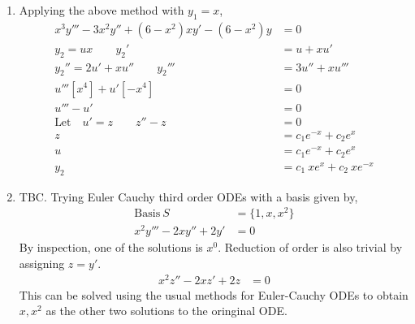 \begin{enumerate}
\begin{enumerate}
              \item Applying the above method with $ y_{1} = x $,
                    \begin{align}
                        x^{3}y''' - 3x^{2}y'' + (6 - x^{2})xy' - (6 - x^{2})y
                                                               & = 0             \\
                        y_{2} = ux \qquad y_{2}'               & = u + xu'       \\
                        y_{2}'' =2u' + xu'' \qquad y_{2}'''    & = 3u'' + xu'''  \\
                        u'''[x^{4}] + u'[-x^{4}]               & = 0             \\
                        u''' - u'                              & = 0             \\
                        \text{Let} \quad u' = z \qquad z'' - z & = 0             \\
                        z                                      & = c_{1}e^{-x}
                        + c_{2}e^{x}                                             \\
                        u                                      & = c_{1}e^{-x}
                        + c_{2}e^{x}                                             \\
                        y_{2}                                  & = c_{1}\ xe^{x}
                        + c_{2}\ xe^{-x}
                    \end{align}

              \item TBC. Trying Euler Cauchy third order ODEs with a basis given by,
                    \begin{align}
                        \text{Basis}\ S         & = \{1, x, x^{2}\} \\
                        x^{2}y''' - 2xy'' + 2y' & = 0
                    \end{align}
                    By inspection, one of the solutions is $ x^{0} $. Reduction of order
                    is also trivial by assigning $ z = y' $.
                    \begin{align}
                        x^{2}z'' - 2xz' + 2z & = 0
                    \end{align}
                    This can be solved using the usual methods for Euler-Cauchy ODEs to
                    obtain $ x, x^{2} $ as the other two solutions to the oringinal ODE.
          \end{enumerate}

\end{enumerate}